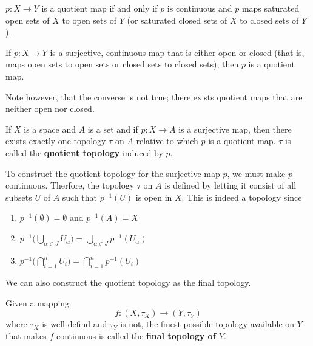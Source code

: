 \documentclass{article}
\begin{document}
    \begin{definition}
    $p: X \longrightarrow Y$ is a quotient map if and only if $p$ is continuous and $p$ maps saturated open sets of $X$ to open sets of $Y$ (or saturated closed sets of $X$ to closed sets of $Y$). 
    \end{definition}

    \begin{proposition}
    If $p: X \longrightarrow Y$ is a surjective, continuous map that is either open or closed (that is, maps open sets to open sets or closed sets to closed sets), then $p$ is a quotient map. 

    Note however, that the converse is not true; there exists quotient maps that are neither open nor closed. 
    \end{proposition}

    \begin{definition}
    If $X$ is a space and $A$ is a set and if $p: X \longrightarrow A$ is a surjective map, then there exists exactly one topology $\tau$ on $A$ relative to which $p$ is a quotient map. $\tau$ is called the \textbf{quotient topology} induced by $p$. 
    \end{definition}

    To construct the quotient topology for the surjective map $p$, we must make $p$ continuous. Therfore, the topology $\tau$ on $A$ is defined by letting it consist of all subsets $U$ of $A$ such that $p^{-1}(U)$ is open in $X$. This is indeed a topology since
    \begin{enumerate}
        \item $p^{-1} (\emptyset) = \emptyset$ and $p^{-1}(A) = X$
        \item $p^{-1} \Big( \bigcup_{\alpha \in J} U_\alpha \Big) = \bigcup_{\alpha \in J} p^{-1} (U_\alpha)$
        \item $p^{-1} \Big( \bigcap_{i=1}^n U_i \Big) = \bigcap_{i=1}^n p^{-1} (U_i)$
    \end{enumerate}

    We can also construct the quotient topology as the final topology. 

    \begin{definition}
    Given a mapping 
    \[f: (X, \tau_X) \longrightarrow (Y, \tau_Y)\]
    where $\tau_X$ is well-defind and $\tau_Y$ is not, the finest possible topology available on $Y$ that makes $f$ continuous is called the \textbf{final topology of $Y$}. 
    \end{definition}
\end{document}
